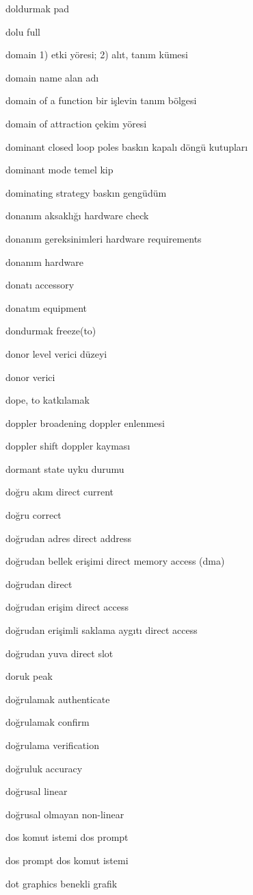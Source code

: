 \documentclass[12pt,fleqn]{article}\usepackage{../../common}
\begin{document}
doldurmak pad

dolu full

domain 1) etki yöresi; 2) alıt, tanım kümesi

domain name alan adı

domain of a function bir işlevin tanım bölgesi

domain of attraction çekim yöresi

dominant closed loop poles baskın kapalı döngü kutupları

dominant mode temel kip

dominating strategy baskın gengüdüm

donanım aksaklığı hardware check

donanım gereksinimleri hardware requirements

donanım hardware

donatı accessory

donatım equipment

dondurmak freeze(to)

donor level verici düzeyi

donor verici

dope, to katkılamak

doppler broadening doppler enlenmesi

doppler shift doppler kayması

dormant state uyku durumu

doğru akım direct current

doğru correct

doğrudan adres direct address

doğrudan bellek erişimi direct memory access (dma)

doğrudan direct

doğrudan erişim direct access

doğrudan erişimli saklama aygıtı direct access

doğrudan yuva direct slot

doruk peak

doğrulamak authenticate

doğrulamak confirm

doğrulama verification

doğruluk accuracy

doğrusal linear

doğrusal olmayan non-linear

dos komut istemi dos prompt

dos prompt dos komut istemi

dot graphics benekli grafik
\end{document}
